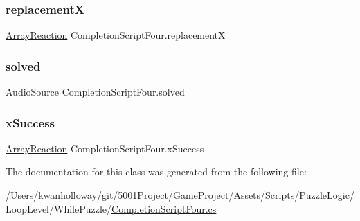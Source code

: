 \subsubsection{\texorpdfstring{replacementX}{replacementX}}
{\footnotesize\ttfamily \hyperlink{class_array_reaction}{Array\+Reaction} Completion\+Script\+Four.\+replacementX}

\mbox{\label{class_completion_script_four_ac78527b696de4ff5992bec7fef332014}} 
\subsubsection{\texorpdfstring{solved}{solved}}
{\footnotesize\ttfamily Audio\+Source Completion\+Script\+Four.\+solved}

\mbox{\label{class_completion_script_four_a747aafbf72eb507c388cb72ad6911b13}} 
\subsubsection{\texorpdfstring{x\+Success}{xSuccess}}
{\footnotesize\ttfamily \hyperlink{class_array_reaction}{Array\+Reaction} Completion\+Script\+Four.\+x\+Success}



The documentation for this class was generated from the following file\+:\begin{DoxyCompactItemize}
\item 
/\+Users/kwanholloway/git/5001\+Project/\+Game\+Project/\+Assets/\+Scripts/\+Puzzle\+Logic/\+Loop\+Level/\+While\+Puzzle/\hyperlink{_completion_script_four_8cs}{Completion\+Script\+Four.\+cs}\end{DoxyCompactItemize}
